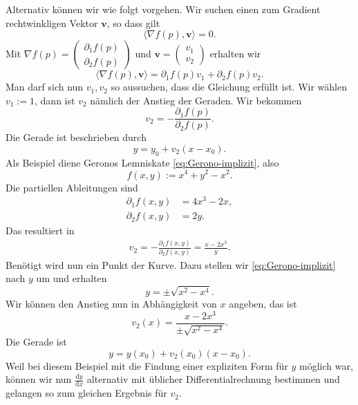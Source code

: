 Alternativ können wir wie folgt vorgehen. Wir suchen einen zum
Gradient rechtwinkligen Vektor $\mathbf v$, so dass gilt%
\begin{equation}
\langle\nabla f(p),\mathbf v\rangle = 0.
\end{equation}
Mit $\nabla f(p) = \begin{pmatrix}\partial_1 f(p)\\ \partial_2 f(p)\end{pmatrix}$
und $\mathbf v = \begin{pmatrix}v_1\\ v_2\end{pmatrix}$ erhalten wir
\begin{equation}
\langle\nabla f(p),\mathbf v\rangle
= \partial_1 f(p)v_1 + \partial_2 f(p)v_2.
\end{equation}
Man darf sich nun $v_1,v_2$ so aussuchen, dass die Gleichung erfüllt
ist. Wir wählen $v_1:=1$, dann ist $v_2$ nämlich der Anstieg der
Geraden. Wir bekommen
\begin{equation}
v_2 = -\frac{\partial_1 f(p)}{\partial_2 f(p)}.
\end{equation}
Die Gerade ist beschrieben durch
\begin{equation}
y = y_0 + v_2(x-x_0).
\end{equation}
Als Beispiel diene Geronos Lemniskate
\eqref{eq:Gerono-implizit}, also
\begin{equation}
f(x,y) := x^4+y^2-x^2.
\end{equation}
Die partiellen Ableitungen sind
\begin{align}
\partial_1 f(x,y) &= 4x^3-2x,\\
\partial_2 f(x,y) &= 2y.
\end{align}
Das resultiert in
\begin{align}
v_2 = -\frac{\partial_1 f(x,y)}{\partial_2 f(x,y)}
= \frac{x-2x^3}{y}.
\end{align}
Benötigt wird nun ein Punkt der Kurve. Dazu stellen wir
\eqref{eq:Gerono-implizit} nach $y$ um und erhalten
\begin{equation}
y = \pm\sqrt{x^2-x^4}.
\end{equation}
Wir können den Anstieg nun in Abhängigkeit von $x$ angeben, das ist
\begin{equation}
v_2(x) = \frac{x-2x^3}{\pm\sqrt{x^2-x^4}}.
\end{equation}
Die Gerade ist
\begin{equation}
y = y(x_0) + v_2(x_0)(x-x_0).
\end{equation}
Weil bei diesem Beispiel mit die Findung einer expliziten Form für $y$
möglich war, können wir nun $\frac{\mathrm dy}{\mathrm dx}$ alternativ
mit üblicher Differentialrechnung bestimmen und gelangen so zum
gleichen Ergebnis für $v_2$.


